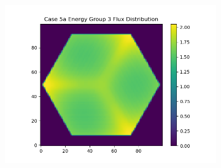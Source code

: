 \documentclass[letterpaper,11pt]{report}
\begin{document}
\begin{figure}[H]
\begin{subfigure}{.33\textwidth}
              \centering
              \includegraphics[width=1.1\linewidth]{../../phase1a/case5a/analysis_output/p1a_5a_e_eg3.png}
              \caption{}
            \end{subfigure}
  

\end{figure}
\end{document}
